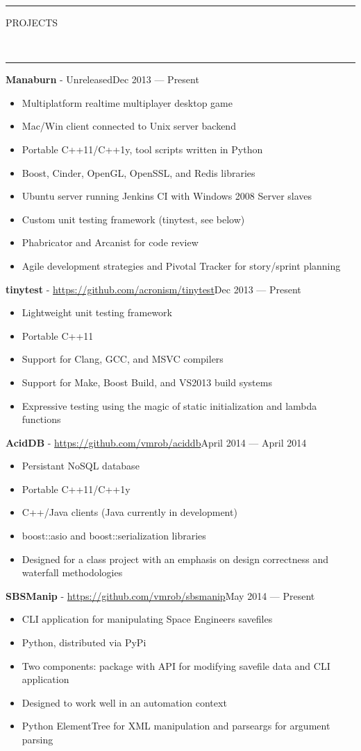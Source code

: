 \documentclass[10pt, letterpaper, oneside]{article}
\newcommand{\HRule}[2]{\textcolor{#1}{\rule{\linewidth}{#2}}}
\newcommand{\sectiontitle}[1]{\begin{minipage}{\textwidth}\HRule{black}{0.25mm}\vspace{-10pt}\begin{center}\Large\MakeUppercase{#1}\end{center}\end{minipage}\\\HRule{light-grey}{0.15mm}\vspace{\baselineskip}}
\newenvironment{ressection}[1]{
  \sectiontitle{#1}}
  {\vspace{0.5\baselineskip}}
\newcommand{\resitem}[1]{
    \vspace{2pt}
    \item \begin{flushleft} #1 \end{flushleft}
}
\newcommand{\resentryheader}[3]{
    \vspace{-5pt}
    \textbf{#1} - #2\hspace{\stretch{1}}\textcolor{light-grey}{#3}\\
}
\newenvironment{resentry}[3]{
  \begin{minipage}{\textwidth}
    \resentryheader{#1}{#2}{#3}
        \vspace{-\baselineskip}
    \begin{itemize}[noitemsep,nolistsep]
}{
    \end{itemize}
        \vspace{\baselineskip}
        \end{minipage}
}
\begin{document}
\begin{ressection}{Projects}

  \begin{resentry}{Manaburn}{Unreleased}{Dec 2013 --- Present}
    \resitem{Multiplatform realtime multiplayer desktop game}
    \resitem{Mac/Win client connected to Unix server backend}
    \resitem{Portable C++11/C++1y, tool scripts written in Python}
    \resitem{Boost, Cinder, OpenGL, OpenSSL, and Redis libraries}
    \resitem{Ubuntu server running Jenkins CI with Windows 2008 Server slaves}
    \resitem{Custom unit testing framework (tinytest, see below)}
    \resitem{Phabricator and Arcanist for code review}
    \resitem{Agile development strategies and Pivotal Tracker for story/sprint planning}
  \end{resentry}
 
  \begin{resentry}{tinytest}{\href{https://github.com/acronism/tinytest}{https://github.com/acronism/tinytest}}{Dec 2013 --- Present}
    \resitem{Lightweight unit testing framework}
    \resitem{Portable C++11}
    \resitem{Support for Clang, GCC, and MSVC compilers}
    \resitem{Support for Make, Boost Build, and VS2013 build systems}
    \resitem{Expressive testing using the magic of static initialization and lambda functions}
  \end{resentry}

  \begin{resentry}{AcidDB}{\href{https://github.com/vmrob/aciddb}{https://github.com/vmrob/aciddb}}{April 2014 --- April 2014}
    \resitem{Persistant NoSQL database}
    \resitem{Portable C++11/C++1y}
    \resitem{C++/Java clients (Java currently in development)}
    \resitem{boost::asio and boost::serialization libraries}
    \resitem{Designed for a class project with an emphasis on design correctness and waterfall methodologies}
  \end{resentry}

  \begin{resentry}{SBSManip}{\href{https://github.com/vmrob/sbsmanip}{https://github.com/vmrob/sbsmanip}}{May 2014 --- Present}
    \resitem{CLI application for manipulating Space Engineers savefiles}
    \resitem{Python, distributed via PyPi}
    \resitem{Two components: package with API for modifying savefile data and CLI application}
    \resitem{Designed to work well in an automation context}
    \resitem{Python ElementTree for XML manipulation and parseargs for argument parsing}
  \end{resentry}
 
\end{ressection}
 
\end{document}
